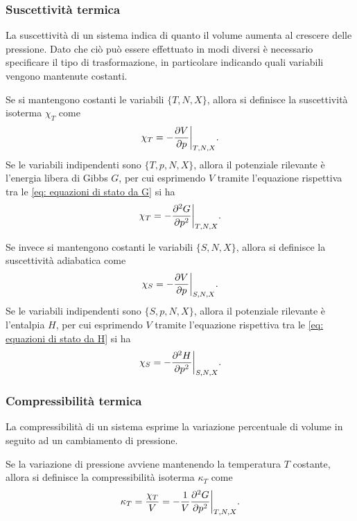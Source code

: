 \subsubsection{Suscettività termica}
La suscettività di un sistema indica di quanto il volume aumenta al crescere delle pressione. Dato che ciò può essere effettuato in modi diversi è necessario specificare il tipo di trasformazione, in particolare indicando quali variabili vengono mantenute costanti.

Se si mantengono costanti le variabili $\{T,N,X\}$, allora si definisce la suscettività isoterma $\chi_T$ come
\begin{equation}
    \chi_T = -\frac{\partial V}{\partial p}\bigg|_{T,N,X}.
\end{equation}
Se le variabili indipendenti sono $\{T,p,N,X\}$, allora il potenziale rilevante è l'energia libera di Gibbs $G$, per cui esprimendo $V$ tramite l'equazione rispettiva tra le \eqref{eq: equazioni di stato da G} si ha
\begin{equation}
    \chi_T = -\frac{\partial^2 G}{\partial p^2}\bigg|_{T,N,X}. 
\end{equation}

Se invece si mantengono costanti le variabili $\{S,N,X\}$, allora si definisce la suscettività adiabatica come
\begin{equation}
    \chi_S = -\frac{\partial V}{\partial p}\bigg|_{S,N,X}.
\end{equation}
Se le variabili indipendenti sono $\{S,p,N,X\}$, allora il potenziale rilevante è l'entalpia $H$, per cui esprimendo $V$ tramite l'equazione rispettiva tra le \eqref{eq: equazioni di stato da H} si ha
\begin{equation}
    \chi_S = -\frac{\partial^2 H}{\partial p^2}\bigg|_{S,N,X}.
\end{equation}

\subsubsection{Compressibilità termica}
La compressibilità di un sistema esprime la variazione percentuale di volume in seguito ad un cambiamento di pressione.

Se la variazione di pressione avviene mantenendo la temperatura $T$ costante, allora si definisce la compressibilità isoterma $\kappa_T$ come
\begin{equation}
    \kappa_T = \frac{\chi_T}{V} = -\frac{1}{V}\frac{\partial^2 G}{\partial p^2}\bigg|_{T,N,X}.
\end{equation}


